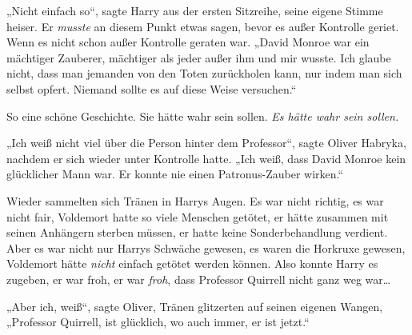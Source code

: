 „Nicht einfach so“, sagte Harry aus der ersten Sitzreihe, seine eigene Stimme heiser. Er \emph{musste} an diesem Punkt etwas sagen, bevor es außer Kontrolle geriet. Wenn es nicht schon außer Kontrolle geraten war.
„David Monroe war ein mächtiger Zauberer, mächtiger als jeder außer ihm und mir wusste. Ich glaube nicht, dass man jemanden von den Toten zurückholen kann, nur indem man sich selbst opfert. Niemand sollte es auf diese Weise versuchen.“

So eine schöne Geschichte. Sie hätte wahr sein sollen. \emph{Es hätte wahr sein sollen.}

„Ich weiß nicht viel über die Person hinter dem Professor“, sagte Oliver Habryka, nachdem er sich wieder unter Kontrolle hatte. „Ich weiß, dass David Monroe kein glücklicher Mann war. Er konnte nie einen Patronus-Zauber wirken.“

Wieder sammelten sich Tränen in Harrys Augen.
Es war nicht richtig, es war nicht fair, Voldemort hatte so viele Menschen getötet, er hätte zusammen mit seinen Anhängern sterben müssen, er hatte keine Sonderbehandlung verdient.
Aber es war nicht nur Harrys Schwäche gewesen, es waren die Horkruxe gewesen, Voldemort hätte \emph{nicht} einfach getötet werden können. Also konnte Harry es zugeben, er war froh, er war \emph{froh}, dass Professor Quirrell nicht ganz weg war…

„Aber ich, weiß“, sagte Oliver, Tränen glitzerten auf seinen eigenen Wangen, „Professor Quirrell, ist glücklich, wo auch immer, er ist jetzt.“

